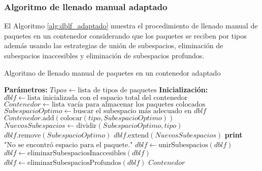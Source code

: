 \subsubsection{Algoritmo de llenado manual adaptado}

El Algoritmo \ref{alg:dblf_adaptado} muestra el procedimiento de llenado manual de paquetes en un contenedor considerando que los paquetes se reciben por tipos además usando las estrategias de unión de subespacios, eliminación de subespacios inaccesibles y eliminación de subespacios profundos.

\begin{algorithm}[H]
\caption{Algoritmo de llenado manual de paquetes en un contenedor adaptado}
\label{alg:dblf_adaptado}
\begin{algorithmic}[1]
    \State \textbf{Parámetros:} $Tipos \gets \text{lista de tipos de paquetes}$
    \State \textbf{Inicialización:} $dblf \gets \text{lista inicializada con el espacio total del contenedor}$
    \State $Contenedor \gets \text{lista vacía para almacenar los paquetes colocados}$
            \State $SubespacioOptimo \gets \text{buscar el subespacio más adecuado en } dblf$
                \State $Contenedor.\text{add}( \text{colocar}(tipo, SubespacioOptimo) )$
                \State $NuevosSubespacios \gets \text{dividir}(SubespacioOptimo, tipo)$
                \State $dblf.\text{remove}(SubespacioOptimo)$
                \State $dblf.\text{extend}(NuevosSubespacios)$
            \Else
                \State \textbf{print} $\text{"No se encontró espacio para el paquete."}$
            \EndIf
        \EndFor
        \State $dblf \gets \text{unirSubespacios}(dblf)$
        \State $dblf \gets \text{eliminarSubespaciosInaccesibles}(dblf)$
        \State $dblf \gets \text{eliminarSubespaciosProfundos}(dblf)$
    \EndFor
    \State \Return $Contenedor$
\end{algorithmic}
\end{algorithm}

